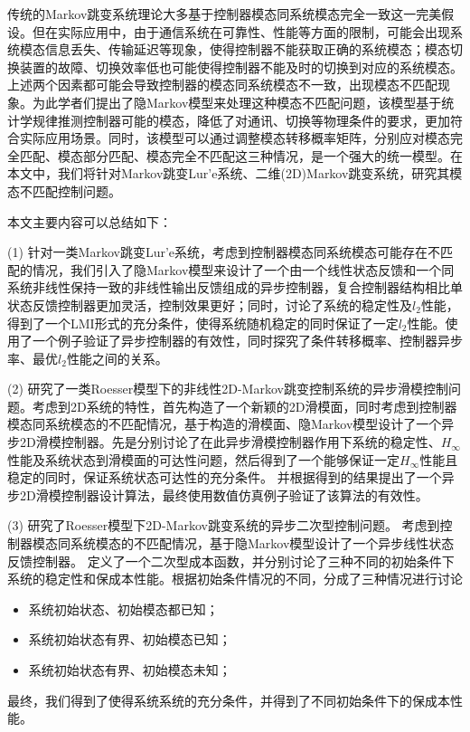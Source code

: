 
\begin{cabstract}
	传统的Markov跳变系统理论大多基于控制器模态同系统模态完全一致这一完美假设。但在实际应用中，由于通信系统在可靠性、性能等方面的限制，可能会出现系统模态信息丢失、传输延迟等现象，使得控制器不能获取正确的系统模态；模态切换装置的故障、切换效率低也可能使得控制器不能及时的切换到对应的系统模态。上述两个因素都可能会导致控制器的模态同系统模态不一致，出现模态不匹配现象。为此学者们提出了隐Markov模型来处理这种模态不匹配问题，该模型基于统计学规律推测控制器可能的模态，降低了对通讯、切换等物理条件的要求，更加符合实际应用场景。同时，该模型可以通过调整模态转移概率矩阵，分别应对模态完全匹配、模态部分匹配、模态完全不匹配这三种情况，是一个强大的统一模型。在本文中，我们将针对Markov跳变Lur'e系统、二维(2D)Markov跳变系统，研究其模态不匹配控制问题。
	
	本文主要内容可以总结如下：
	
	(1) 针对一类Markov跳变Lur'e系统，考虑到控制器模态同系统模态可能存在不匹配的情况，我们引入了隐Markov模型来设计了一个由一个线性状态反馈和一个同系统非线性保持一致的非线性输出反馈组成的异步控制器，复合控制器结构相比单状态反馈控制器更加灵活，控制效果更好；同时，讨论了系统的稳定性及$l_2$性能，得到了一个LMI形式的充分条件，使得系统随机稳定的同时保证了一定$l_2$性能。使用了一个例子验证了异步控制器的有效性，同时探究了条件转移概率、控制器异步率、最优$l_2$性能之间的关系。
	
	(2) 研究了一类Roesser模型下的非线性2D-Markov跳变控制系统的异步滑模控制问题。考虑到2D系统的特性，首先构造了一个新颖的2D滑模面，同时考虑到控制器模态同系统模态的不匹配情况，基于构造的滑模面、隐Markov模型设计了一个异步2D滑模控制器。先是分别讨论了在此异步滑模控制器作用下系统的稳定性、$H_\infty$性能及系统状态到滑模面的可达性问题，然后得到了一个能够保证一定$H_\infty$性能且稳定的同时，保证系统状态可达性的充分条件。 并根据得到的结果提出了一个异步2D滑模控制器设计算法，最终使用数值仿真例子验证了该算法的有效性。
	
	(3) 研究了Roesser模型下2D-Markov跳变系统的异步二次型控制问题。 考虑到控制器模态同系统模态的不匹配情况，基于隐Markov模型设计了一个异步线性状态反馈控制器。 定义了一个二次型成本函数，并分别讨论了三种不同的初始条件下系统的稳定性和保成本性能。根据初始条件情况的不同，分成了三种情况进行讨论
		\begin{itemize}
			\item 系统初始状态、初始模态都已知；
			\item 系统初始状态有界、初始模态已知；
			\item 系统初始状态有界、初始模态未知；
		\end{itemize}
	最终，我们得到了使得系统系统的充分条件，并得到了不同初始条件下的保成本性能。
	

  
\end{cabstract}

